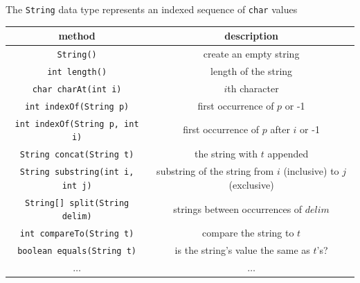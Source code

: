 \documentclass[8pt,a4paper,compress]{beamer}
\begin{document}
\begin{frame}[fragile]
\pause
The \lstinline{String} data type represents an indexed sequence of \lstinline{char} values

\begin{center}
\begin{tabular}{cc}
method & description \\ \hline
\lstinline$String()$ & create an empty string \\
\lstinline$int length()$ & length of the string \\
\lstinline$char charAt(int i)$ & $i$th character \\
\lstinline$int indexOf(String p)$ & first occurrence of $p$ or -1 \\ \lstinline$int indexOf(String p, int i)$ & first occurrence of $p$ after $i$ or -1 \\
\lstinline$String concat(String t)$ & the string with $t$ appended \\
\lstinline$String substring(int i, int j)$ & substring of the string from $i$ (inclusive) to $j$ (exclusive) \\
\lstinline$String[] split(String delim)$ & strings between occurrences of $delim$ \\
\lstinline$int compareTo(String t)$ & compare the string to $t$ \\
\lstinline$boolean equals(String t)$ & is the string's value the same as $t$'s? \\
$\dots$ & $\dots$
\end{tabular} 
\end{center}
\end{frame}
\end{document}
